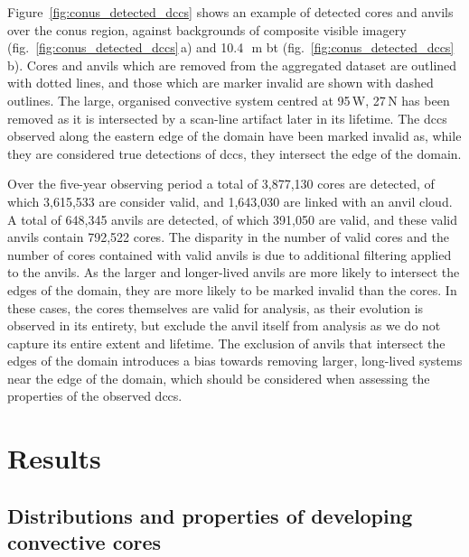 Figure~\ref{fig:conus_detected_dccs} shows an example of detected cores and anvils over the \acrshort{conus} region, against backgrounds of composite visible imagery (fig.~\ref{fig:conus_detected_dccs}\,a) and 10.4\,\unit{\mu m} \acrshort{bt} (fig.~\ref{fig:conus_detected_dccs}\,b).
Cores and anvils which are removed from the aggregated dataset are outlined with dotted lines, and those which are marker invalid are shown with dashed outlines.
The large, organised convective system centred at 95\,\textdegree W, 27\,\textdegree N has been removed as it is intersected by a scan-line artifact later in its lifetime.
The \acrshort{dcc}s observed along the eastern edge of the domain have been marked invalid as, while they are considered true detections of \acrshort{dcc}s, they intersect the edge of the domain.

Over the five-year observing period a total of 3,877,130 cores are detected, of which 3,615,533 are consider valid, and 1,643,030 are linked with an anvil cloud. 
A total of 648,345 anvils are detected, of which 391,050 are valid, and these valid anvils contain 792,522 cores.
The disparity in the number of valid cores and the number of cores contained with valid anvils is due to additional filtering applied to the anvils.
As the larger and longer-lived anvils are more likely to intersect the edges of the domain, they are more likely to be marked invalid than the cores.
In these cases, the cores themselves are valid for analysis, as their evolution is observed in its entirety, but exclude the anvil itself from analysis as we do not capture its entire extent and lifetime.
The exclusion of anvils that intersect the edges of the domain introduces a bias towards removing larger, long-lived systems near the edge of the domain, which should be considered when assessing the properties of the observed \acrshort{dcc}s.


\section{Results}


\subsection{Distributions and properties of developing convective cores} \label{sec:core_properties}

